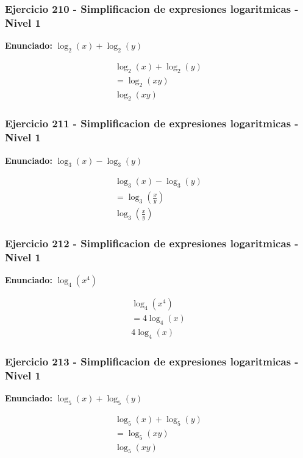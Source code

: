 \documentclass[12pt,a4paper]{article}
\begin{document}
\subsubsection*{Ejercicio 210 - Simplificacion de expresiones logaritmicas - Nivel 1}
\textbf{Enunciado:} \(\log_{2}\left(x\right)+\log_{2}\left(y\right)\)

\[
\begin{aligned}
\log_{2}\left(x\right)+\log_{2}\left(y\right)\\
=\log_{2}\left(xy\right)\\
\boxed{\log_{2}\left(xy\right)}
\end{aligned}
\]


\subsubsection*{Ejercicio 211 - Simplificacion de expresiones logaritmicas - Nivel 1}
\textbf{Enunciado:} \(\log_{3}\left(x\right)-\log_{3}\left(y\right)\)

\[
\begin{aligned}
\log_{3}\left(x\right)-\log_{3}\left(y\right)\\
=\log_{3}\left(\frac{x}{y}\right)\\
\boxed{\log_{3}\left(\frac{x}{y}\right)}
\end{aligned}
\]


\subsubsection*{Ejercicio 212 - Simplificacion de expresiones logaritmicas - Nivel 1}
\textbf{Enunciado:} \(\log_{4}\left(x^{4}\right)\)

\[
\begin{aligned}
\log_{4}\left(x^{4}\right)\\
=4\log_{4}\left(x\right)\\
\boxed{4\log_{4}\left(x\right)}
\end{aligned}
\]


\subsubsection*{Ejercicio 213 - Simplificacion de expresiones logaritmicas - Nivel 1}
\textbf{Enunciado:} \(\log_{5}\left(x\right)+\log_{5}\left(y\right)\)

\[
\begin{aligned}
\log_{5}\left(x\right)+\log_{5}\left(y\right)\\
=\log_{5}\left(xy\right)\\
\boxed{\log_{5}\left(xy\right)}
\end{aligned}
\]
\end{document}
